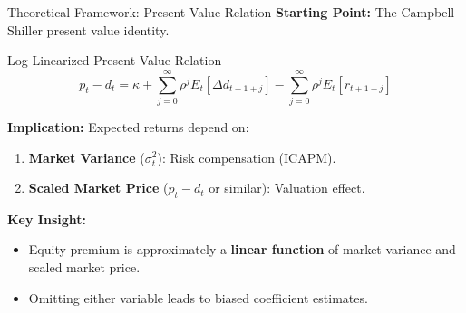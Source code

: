 \documentclass{beamer}
\begin{document}
\begin{frame}{Theoretical Framework: Present Value Relation}
    \textbf{Starting Point:} The Campbell-Shiller present value identity.
    
    \begin{block}{Log-Linearized Present Value Relation}
        \begin{equation}
            p_t - d_t = \kappa + \sum_{j=0}^{\infty} \rho^j E_t[\Delta d_{t+1+j}] - \sum_{j=0}^{\infty} \rho^j E_t[r_{t+1+j}]
        \end{equation}
    \end{block}
    
    \textbf{Implication:} Expected returns depend on:
    \begin{enumerate}
        \item \textbf{Market Variance} ($\sigma_t^2$): Risk compensation (ICAPM).
        \item \textbf{Scaled Market Price} ($p_t - d_t$ or similar): Valuation effect.
    \end{enumerate}
    
    \vspace{0.3cm}
    \textbf{Key Insight:}
    \begin{itemize}
        \item Equity premium is approximately a \textbf{linear function} of market variance and scaled market price.
        \item Omitting either variable leads to biased coefficient estimates.
    \end{itemize}
\end{frame}
\end{document}
